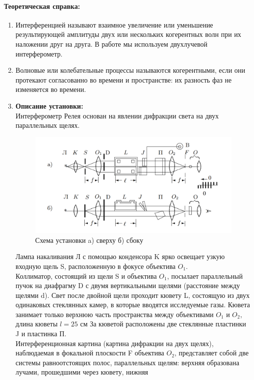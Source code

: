 \documentclass[a4paper,12pt]{article}
\begin{document}
\paragraph{Теоретическая справка:}
\begin{enumerate}
\itemsep0em
\item Интерференцией называют взаимное увеличение или уменьшение результирующей амплитуды двух или нескольких когерентных волн при их наложении друг на друга. В работе мы используем двухлучевой интерферометр. 
\item Волновые или колебательные процессы называются когерентными, если они протекают согласованно во времени и пространстве: их разность фаз не изменяется во времени.
\item \textbf{Описание установки:}\\
Интерферометр Релея основан на явлении дифракции света на двух параллельных щелях. 
\begin{figure}[h!]
\includegraphics[scale=0.6]{setup.png} 
\caption{Схема установки a) сверху б) сбоку}
\end{figure}
Лампа накаливания Л с помощью конденсора K ярко освещает узкую
входную щель S, расположенную в фокусе объектива $O_1$. \\ Коллиматор, состоящий из щели S и объектива $O_1$, посылает параллельный пучок на диафрагму D с двумя вертикальными
щелями (расстояние между щелями d). Свет после двойной щели проходит кювету L, состоящую из двух одинаковых стеклянных камер, в
которые вводятся исследуемые газы. Кювета занимает только верхнюю часть пространства между
объективами $O_1$ и $O_2$, длина кюветы $l = 25$ см За кюветой расположены две
стеклянные пластинки J  и пластинка П.\\
Интерференционная картина (картина дифракции на двух щелях),
наблюдаемая в фокальной плоскости F объектива $O_2$, представляет собой две системы равноотстоящих полос, параллельных щелям: верхняя образована лучами, прошедшими через кювету, нижняя

\end{enumerate}
\end{document}
